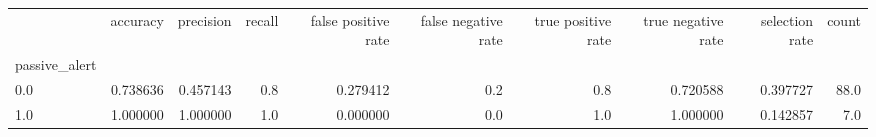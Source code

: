\begin{tabular}{lrrrrrrrrr}
\toprule
{} &  accuracy &  precision &  recall &  false positive rate &  false negative rate &  true positive rate &  true negative rate &  selection rate &  count \\
passive\_alert &           &            &         &                      &                      &                     &                     &                 &        \\
\midrule
0.0           &  0.738636 &   0.457143 &     0.8 &             0.279412 &                  0.2 &                 0.8 &            0.720588 &        0.397727 &   88.0 \\
1.0           &  1.000000 &   1.000000 &     1.0 &             0.000000 &                  0.0 &                 1.0 &            1.000000 &        0.142857 &    7.0 \\
\bottomrule
\end{tabular}
